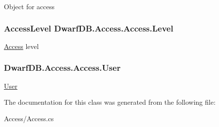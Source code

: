 Object for access 

\hypertarget{class_dwarf_d_b_1_1_access_1_1_access_ae25a83ec0bbcaa858dd5dbac88ac7e1b}{
\subsubsection[{Level}]{\setlength{\rightskip}{0pt plus 5cm}Access\+Level Dwarf\+D\+B.\+Access.\+Access.\+Level\hspace{0.3cm}{\ttfamily [get]}}}\label{class_dwarf_d_b_1_1_access_1_1_access_ae25a83ec0bbcaa858dd5dbac88ac7e1b}


\hyperlink{class_dwarf_d_b_1_1_access_1_1_access}{Access} level 

\hypertarget{class_dwarf_d_b_1_1_access_1_1_access_a2ce47e616d244725b801e6c86b87e54a}{
\subsubsection[{User}]{ Dwarf\+D\+B.\+Access.\+Access.\+User\hspace{0.3cm}{\ttfamily [get]}}}\label{class_dwarf_d_b_1_1_access_1_1_access_a2ce47e616d244725b801e6c86b87e54a}


\hyperlink{namespace_dwarf_d_b_1_1_user}{User} 



The documentation for this class was generated from the following file\+:\begin{DoxyCompactItemize}
\item 
Access/Access.\+cs\end{DoxyCompactItemize}
